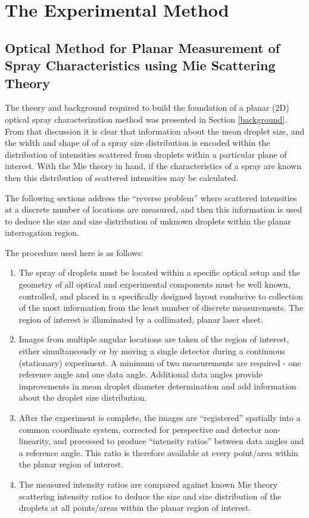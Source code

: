 \chapter{The Experimental Method}
\label{chapter_exp}
\section{Optical Method for Planar Measurement of Spray Characteristics using Mie Scattering Theory}

The theory and background required to build the foundation of a planar (2D) optical spray characterization method was presented in Section \ref{background}.  From that discussion it is clear that information about the mean droplet size,  and the width and shape of of a spray size distribution is encoded within the distribution of intensities scattered from droplets within a particular plane of interest.  With the Mie theory in hand, if the characteristics of a spray are known then this distribution of scattered intensities may be calculated.  

The following sections address the ``reverse problem'' where scattered intensities at a discrete number of locations are measured, and then this information is used to deduce the size and size distribution of unknown droplets within the planar interrogation region.

The procedure used here is as follows:
\begin{enumerate}
\item The spray of droplets must be located within a specific optical setup and the geometry of all optical and experimental components must be well known, controlled, and placed in a specifically designed layout conducive to collection of the most information from the least number of discrete measurements.  The region of interest is illuminated by a collimated, planar laser sheet.
\item Images from multiple angular locations are taken of the region of interest, either simultaneously or by moving a single detector during a continuous (stationary) experiment.  A minimum of two measurements are required - one reference angle and one data angle.  Additional data angles provide improvements in mean droplet diameter determination and add information about the droplet size distribution.
\item After the experiment is complete, the images are ``registered'' spatially into a common coordinate system, corrected for perspective and detector non-linearity, and processed to produce ``intensity ratios'' between data angles and a reference angle.  This ratio is therefore available at every point/area within the planar region of interest.
\item The measured intensity ratios are compared against known Mie theory scattering intensity ratios to deduce the size and size distribution of the droplets at all points/areas within the planar region of interest.
\end{enumerate}

